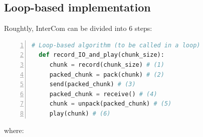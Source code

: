 \subsection{Loop-based implementation}

Roughtly, InterCom can be divided into 6 steps:

\begin{lstlisting}[language=Python,numbers=left]
  # Loop-based algorithm (to be called in a loop)
  def record_IO_and_play(chunk_size):
     chunk = record(chunk_size) # (1)
     packed_chunk = pack(chunk) # (2)
     send(packed_chunk) # (3)
     packed_chunk = receive() # (4)
     chunk = unpack(packed_chunk) # (5)
     play(chunk) # (6)
\end{lstlisting}


where:

